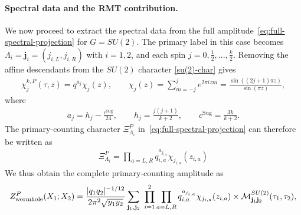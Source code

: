 \documentclass[11pt]{article}
\numberwithin{equation}{section}
\begin{document}
\paragraph{Spectral data and the RMT contribution.}
We now proceed to  extract the spectral data  from the full amplitude~\eqref{eq:full-spectral-projection} for $G=SU(2)$. The primary label in this case becomes $\Lambda_i=\mathbf j_i=(j_{i,L},j_{i,R})$ with $i=1,2$, and each spin $j=0,\frac{1}{2},...,\frac{k}{2}$. Removing the affine descendants from the $SU(2)$ character \eqref{su(2)-char} gives
\begin{align}
    \chi_j^{k,P}(\tau,z)=q^{a_j}\chi_j(z),\qquad
 \chi_j(z)=\sum_{m=-j}^j e^{2\pi i zm}
 =\frac{\sin((2j+1)\pi z)}{\sin(\pi z)},
\end{align}
where
\begin{align}
     a_j=h_j-\frac{c^{\mathrm{Sug}}}{24},\qquad
 h_j=\frac{j(j+1)}{k+2},\qquad c^{\mathrm{Sug}}=\frac{3k}{k+2}.
\end{align}
The primary-counting character $\Xi_{\Lambda_i}^P$ in~\eqref{eq:full-spectral-projection}  can therefore be written as
\begin{align}
    \Xi_{\Lambda_i}^P= \prod_{a=L,R}q_{i,a}^{a_{j_{i,a}}}\chi_{j_{i,a}}(z_{i,a})
\end{align}
We thus obtain the complete primary-counting amplitude as
\begin{equation}
\begin{aligned}
 Z_{\rm wormhole}^{P}(X_1;X_2)
 =\frac{|q_1q_2|^{-1/12}}{2\pi^2\sqrt{y_1y_2}}
 \sum_{\mathbf j_1,\mathbf j_2} ~\prod_{i=1}^2\prod_{a=L,R}q_{i,a}^{a_{j_{i,a}}}\chi_{j_{i,a}}(z_{i,a}) \times  \mathcal M^{SU(2)}_{\mathbf j_1\mathbf j_2}(\tau_1,\tau_2),
\end{aligned}
\label{eq:SU2-full-primary-amplitude}
\end{equation}
\end{document}
